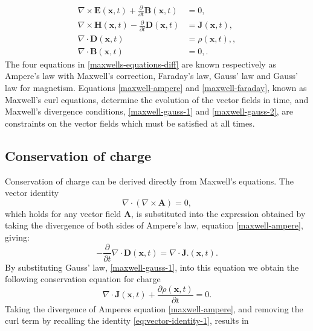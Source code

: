 \begin{subequations}
\label{maxwells-equations-diff}
\begin{align}
    \nabla \times \mathbf{E}(\mathbf{x},t) + \frac{\partial }{\partial t} \mathbf{B}(\mathbf{x}, t) &= 0, \label{maxwell-faraday} \\
    \nabla \times \mathbf{H}(\mathbf{x},t) - \frac{\partial }{\partial t} \mathbf{D}(\mathbf{x}, t) &= \mathbf{J}(\mathbf{x},t), \label{maxwell-ampere} \\
    \nabla \cdot \mathbf{D} (\mathbf{x},t) &= \rho(\mathbf{x},t), \label{maxwell-gauss-1}, \\
    \nabla \cdot \mathbf{B} (\mathbf{x},t) &= 0, \label{maxwell-gauss-2} .
\end{align}
\end{subequations}
The four equations in \ref{maxwells-equations-diff} are known respectively as Ampere's law with Maxwell's correction, Faraday's law, Gauss' law and Gauss' law for magnetism. Equations \ref{maxwell-ampere} and \ref{maxwell-faraday}, known as Maxwell's curl equations, determine the evolution of the vector fields in time, and Maxwell's divergence conditions, \ref{maxwell-gauss-1} and \ref{maxwell-gauss-2}, are constraints on the vector fields which must be satisfied at all times.

\subsection{Conservation of charge}

Conservation of charge can be derived directly from Maxwell's equations. The vector identity
\begin{equation}
\label{eq:vector-identity-1}
\nabla \cdot ( \nabla \times \mathbf{A} ) = 0,
\end{equation}
which holds for any vector field $\mathbf{A}$, is substituted into the expression obtained by taking the divergence of both sides of Ampere's law, equation \ref{maxwell-ampere}, giving:
$$
- \frac{\partial}{\partial t} \nabla \cdot \mathbf{D}(\mathbf{x},t) = \nabla \cdot \mathbf{J}.(\mathbf{x},t) .
$$
By substituting Gauss' law, \ref{maxwell-gauss-1}, into this equation we obtain the following conservation equation for charge
\begin{equation}
\label{eq:maxwell-charge-conservation-2}
\nabla \cdot \mathbf{J}(\mathbf{x},t) + \frac{\partial \rho (\mathbf{x},t) }{\partial t} = 0 .
\end{equation}
Taking the divergence of Amperes equation \ref{maxwell-ampere}, and removing the curl term by recalling the identity \ref{eq:vector-identity-1}, results in


